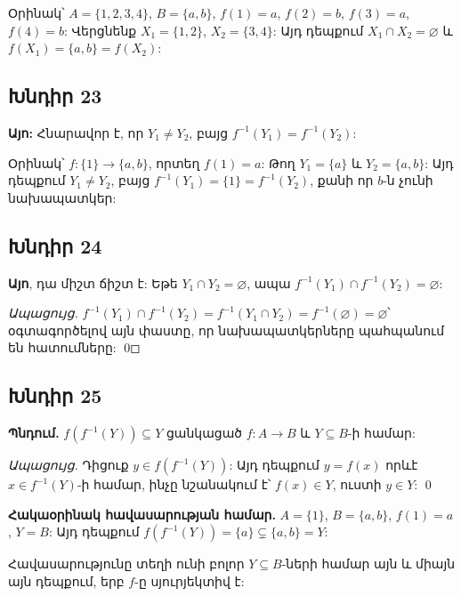 Օրինակ՝ $A=\{1,2,3,4\}$, $B=\{a,b\}$, $f(1)=a$, $f(2)=b$, $f(3)=a$, $f(4)=b$: Վերցնենք $X_1=\{1,2\}$, $X_2=\{3,4\}$: Այդ դեպքում $X_1\cap X_2=\varnothing$ և $f(X_1)=\{a,b\}=f(X_2)$:

\subsection*{Խնդիր 23}
\textbf{Այո:} Հնարավոր է, որ $Y_1\neq Y_2$, բայց $f^{-1}(Y_1)=f^{-1}(Y_2)$:

Օրինակ՝ $f:\{1\}\to\{a,b\}$, որտեղ $f(1)=a$: Թող $Y_1=\{a\}$ և $Y_2=\{a,b\}$: Այդ դեպքում $Y_1\neq Y_2$, բայց $f^{-1}(Y_1)=\{1\}=f^{-1}(Y_2)$, քանի որ $b$-ն չունի նախապատկեր:

\subsection*{Խնդիր 24}
\textbf{Այո}, դա միշտ ճիշտ է: Եթե $Y_1\cap Y_2=\varnothing$, ապա $f^{-1}(Y_1)\cap f^{-1}(Y_2)=\varnothing$:

\emph{Ապացույց.} $f^{-1}(Y_1)\cap f^{-1}(Y_2)=f^{-1}(Y_1\cap Y_2)=f^{-1}(\varnothing)=\varnothing$՝ օգտագործելով այն փաստը, որ նախապատկերները պահպանում են հատումները: \qed

\subsection*{Խնդիր 25}
\textbf{Պնդում.} $f(f^{-1}(Y))\subseteq Y$ ցանկացած $f:A\to B$ և $Y\subseteq B$-ի համար:

\emph{Ապացույց.} Դիցուք $y\in f(f^{-1}(Y))$: Այդ դեպքում $y=f(x)$ որևէ $x\in f^{-1}(Y)$-ի համար, ինչը նշանակում է՝ $f(x)\in Y$, ուստի $y\in Y$: \qed

\textbf{Հակաօրինակ հավասարության համար.} $A=\{1\}$, $B=\{a,b\}$, $f(1)=a$, $Y=B$: Այդ դեպքում $f(f^{-1}(Y))=\{a\}\subsetneq\{a,b\}=Y$:

Հավասարությունը տեղի ունի բոլոր $Y\subseteq B$-ների համար այն և միայն այն դեպքում, երբ $f$-ը սյուրյեկտիվ է: